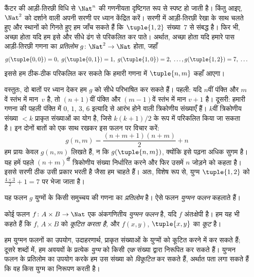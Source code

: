 \documentclass[../../../include/open-logic-section]{subfiles}
\begin{document}

\begin{explain}
कैंटर की आड़ी-तिरछी विधि से $\Nat^n$ की गणनीयता दृष्टिगत रूप से स्पष्ट हो
जाती है। किंतु आइए, $\Nat^2$ को दर्शाने वाली अपनी सरणी पर ध्यान केंद्रित करें।
सरणी में आड़ी-तिरछी रेखा के साथ चलते हुए और स्थानों को गिनते हुए हम जाँच सकते
हैं कि $\tuple{1,2}$ संख्या~$7$ से संबद्ध है। फिर भी, अच्छा होता यदि हम इसे
और सीधे ढंग से परिकलित कर पाते। अर्थात, अच्छा होता यदि हमारे पास आड़ी-तिरछी
गणना का \emph{प्रतिलोम} $g\colon \Nat^2 \to \Nat$ होता, जहाँ
\[
g(\tuple{0,0}) = 0, \;
g(\tuple{0,1}) = 1, \;
g(\tuple{1,0}) = 2, \; \dots,  
g(\tuple{1,2}) = 7, \; \dots
\]
इससे हम ठीक-ठीक परिकलित कर सकते कि हमारी गणना में $\tuple{n, m}$ कहाँ आएगा।

वस्तुतः, दो बातों पर ध्यान देकर हम $g$ को सीधे परिभाषित कर सकते हैं। पहली:
यदि $n$वीं पंक्ति और $m$वें स्तंभ में मान~$v$ है, तो $(n+1)$वीं पंक्ति और
$(m-1)$वें स्तंभ में मान $v + 1$ है। दूसरी: हमारी गणना की पहली पंक्ति में
$0$, $1$, $3$, $6$ इत्यादि से आरंभ होने वाली त्रिकोणीय संख्याएँ हैं। $k$वीं
त्रिकोणीय संख्या $< k$ प्राकृत संख्याओं का योग है, जिसे $k(k+1)/2$ के रूप में
परिकलित किया जा सकता है। इन दोनों बातों को एक साथ रखकर इस फलन पर विचार करें:
\[
  g(n,m) = \frac{(n+m+1)(n+m)}{2} + n
\]
हम प्रायः केवल $g(n, m)$ लिखते हैं, न कि $g(\tuple{n, m})$, क्योंकि इसे
पढ़ना अधिक सुगम है। यह हमें पहले $(n+m)^\text{वीं}$ त्रिकोणीय संख्या निर्धारित करने
और फिर उसमें $n$ जोड़ने को कहता है। इससे सरणी ठीक उसी प्रकार भरती है जैसा हम
चाहते हैं। अतः, विशेष रूप से, युग्म $\tuple{1, 2}$ को
$\frac{4 \times 3}{2} +
1 = 7$ पर भेजा जाता है।

यह फलन $g$ युग्मों के किसी समुच्चय की गणना का \emph{प्रतिलोम} है। ऐसे फलन
\emph{युग्मन फलन} कहलाते हैं।
\end{explain}

\begin{defn}[युग्मन फलन]
  कोई फलन $f\colon A \times B \to \Nat$ एक अंकगणितीय \emph{युग्मन फलन}
  है, यदि $f$ अंतःक्षेपी है। हम यह भी कहते हैं कि $f$, $A \times B$ को
  \emph{कूटित करता है,} और $f(x,y)$, $\tuple{x,y}$ का \emph{कूट} है।
\end{defn}

\begin{explain}
हम युग्मन फलनों का उपयोग, उदाहरणार्थ, प्राकृत संख्याओं के युग्मों को कूटित
करने में कर सकते हैं; दूसरे शब्दों में, हम अवयवों के प्रत्येक \emph{युग्म}
को किसी \emph{एक} संख्या द्वारा निरूपित कर सकते हैं। युग्मन फलन के प्रतिलोम
का उपयोग करके हम उस संख्या को \emph{विकूटित} कर सकते हैं, अर्थात पता लगा
सकते हैं कि वह किस युग्म का निरूपण करती है।
\end{explain}
\end{document}
